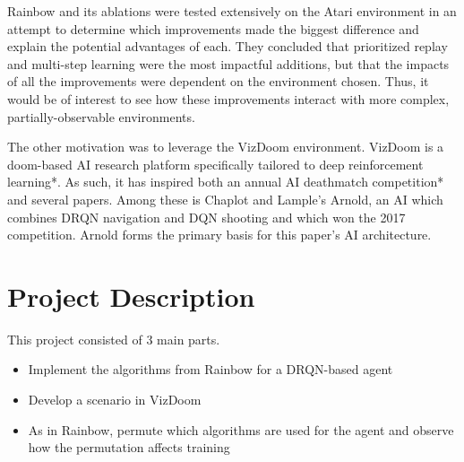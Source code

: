 \documentclass[letterpaper]{article}
\begin{document}
	Rainbow and its ablations were tested extensively on the Atari environment in an attempt to determine which improvements made the biggest difference and explain the potential advantages of each. They concluded that prioritized replay and multi-step learning were the most impactful additions, but that the impacts of all the improvements were dependent on the environment chosen. Thus, it would be of interest to see how these improvements interact with more complex, partially-observable environments. 
	
	The other motivation was to leverage the VizDoom environment. VizDoom is a doom-based AI research platform specifically tailored to deep reinforcement learning*. As such, it has inspired both an annual AI deathmatch competition* and several papers. Among these is Chaplot and Lample's Arnold, an AI which combines DRQN navigation and DQN shooting and which won the 2017 competition. Arnold forms the primary basis for this paper's AI architecture.
	
	\section{Project Description}
	
	This project consisted of 3 main parts.
	\begin{itemize}
		\item Implement the algorithms from Rainbow for a DRQN-based agent
		\item Develop a scenario in VizDoom 
		\item As in Rainbow, permute which algorithms are used for the agent and observe how the permutation affects training
	\end{itemize}
\end{document}
